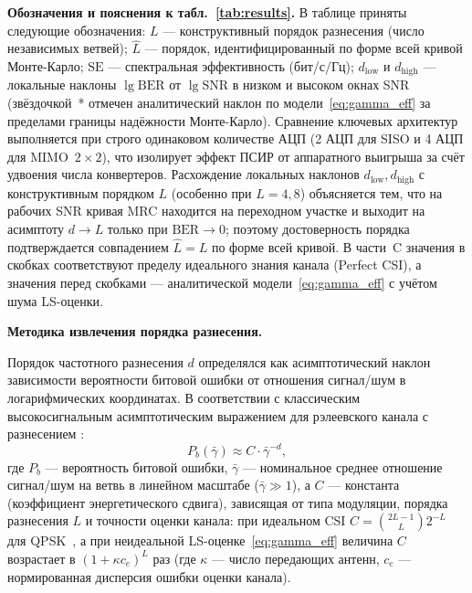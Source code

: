 \documentclass[a4paper,12pt]{article}
\numberwithin{equation}{section}
\newcommand{\BER}{\mathrm{BER}}
\newcommand{\SNR}{\mathrm{SNR}}
\begin{document}
\textbf{Обозначения и пояснения к табл.~\ref{tab:results}.} В таблице приняты следующие обозначения: $L$ --- конструктивный порядок разнесения (число независимых ветвей); $\hat{L}$ --- порядок, идентифицированный по форме всей кривой Монте-Карло; $\text{SE}$ --- спектральная эффективность (бит/с/Гц); $d_{\text{low}}$ и $d_{\text{high}}$ --- локальные наклоны $\lg\BER$ от $\lg\SNR$ в низком и высоком окнах SNR (звёздочкой~* отмечен аналитический наклон по модели~\eqref{eq:gamma_eff} за пределами границы надёжности Монте-Карло). Сравнение ключевых архитектур выполняется при строго одинаковом количестве АЦП (2 АЦП для SISO и 4 АЦП для MIMO~$2{\times}2$), что изолирует эффект ПСИР от аппаратного выигрыша за счёт удвоения числа конвертеров. Расхождение локальных наклонов $d_{\text{low}}, d_{\text{high}}$ с конструктивным порядком $L$ (особенно при $L=4, 8$) объясняется тем, что на рабочих SNR кривая MRC находится на переходном участке и выходит на асимптоту $d \to L$ только при $\BER \to 0$; поэтому достоверность порядка подтверждается совпадением $\hat{L} = L$ по форме всей кривой. В части~C значения в скобках соответствуют пределу идеального знания канала (Perfect CSI), а значения перед скобками --- аналитической модели~\eqref{eq:gamma_eff} с учётом шума LS-оценки.

\textbf{Методика извлечения порядка разнесения.} 

Порядок частотного разнесения $d$ определялся как асимптотический наклон 
зависимости вероятности битовой ошибки от отношения сигнал/шум в логарифмических 
координатах. В соответствии с классическим высокосигнальным асимптотическим выражением для 
рэлеевского канала с разнесением \cite{proakis,goldsmith}:
\begin{equation}
P_b(\bar{\gamma}) \approx C \cdot \bar{\gamma}^{-d},
\label{eq:diversity_asymptotic}
\end{equation}
где $P_b$ --- вероятность битовой ошибки, $\bar{\gamma}$ --- номинальное среднее отношение сигнал/шум 
на ветвь в линейном масштабе ($\bar{\gamma} \gg 1$), а $C$ --- константа (коэффициент энергетического сдвига), зависящая от типа модуляции, порядка разнесения $L$ и точности оценки канала: при идеальном CSI $C = \binom{2L-1}{L} 2^{-L}$ для QPSK~\cite{proakis,goldsmith}, а при неидеальной LS-оценке~\eqref{eq:gamma_eff} величина $C$ возрастает в $(1 + \kappa c_e)^L$ раз (где $\kappa$ --- число передающих антенн, $c_e$ --- нормированная дисперсия ошибки оценки канала).
\end{document}
